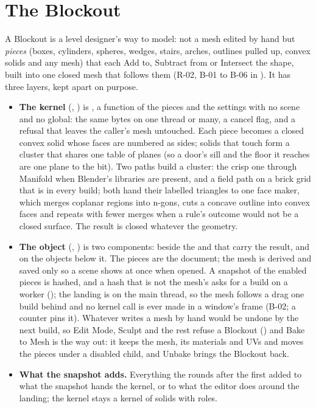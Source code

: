 \section{The Blockout}
A Blockout is a level designer's way to model: not a mesh edited by hand but \emph{pieces} (boxes, cylinders, spheres,
wedges, stairs, arches, outlines pulled up, convex solids and any mesh) that each Add to, Subtract from or Intersect the
shape, built into one closed mesh that follows them (R-02, B-01 to B-06 in ). It has three
layers, kept apart on purpose.
\begin{itemize}
  \item \textbf{The kernel} (, ) is , a function of the pieces and
    the settings with no scene and no global: the same bytes on one thread or many, a cancel flag, and a refusal that
    leaves the caller's mesh untouched. Each piece becomes a closed convex solid whose faces are numbered as sides;
    solids that touch form a cluster that shares one table of planes (so a door's sill and the floor it reaches are one
    plane to the bit). Two paths build a cluster: the crisp one through Manifold \cite{libManifold} when Blender's
    libraries are present, and a field path on a brick grid that is in every build; both hand their labelled
    triangles to one face maker, which merges coplanar regions into n-gons, cuts a concave outline into convex faces and
    repeats with fewer merges when a rule's outcome would not be a closed surface. The result is closed whatever the
    geometry.
  \item \textbf{The object} (, ) is two components:  beside the
     and  that carry the result, and  on the objects below it. The
    pieces are the document; the mesh is derived and saved only so a scene shows at once when opened. A snapshot of the
    enabled pieces is hashed, and a hash that is not the mesh's asks for a build on a worker
    (); the landing is on the main thread, so the mesh follows a drag one build behind
    and no kernel call is ever made in a window's frame (B-02; a counter pins it). Whatever writes a mesh by hand
    would be undone by the next build, so Edit Mode, Sculpt and the rest refuse a Blockout
    () and Bake to Mesh is the way out: it keeps the mesh, its materials and UVs
    and moves the pieces under a disabled child, and Unbake brings the Blockout back.
  \item \textbf{What the snapshot adds.} Everything the rounds after the first added to what the snapshot hands the
    kernel, or to what the editor does around the landing; the kernel stays a kernel of solids with roles.
\end{itemize}

